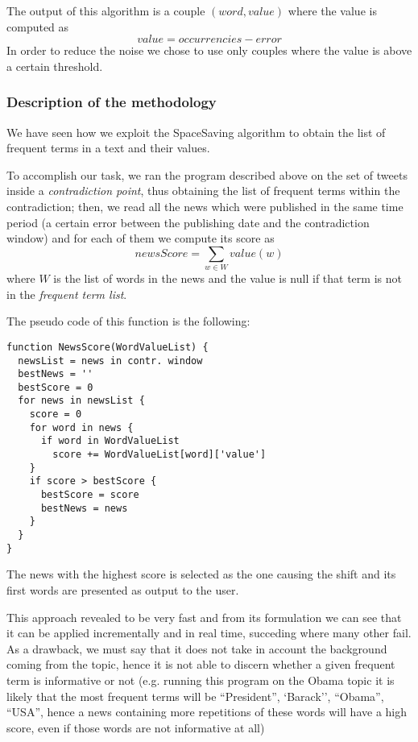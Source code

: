 The output of this algorithm is a couple $(word, value)$ where the value is
computed as 
\begin{displaymath}
	value = occurrencies - error
\end{displaymath}
In order to reduce the noise we chose to use only couples where the value is
above a certain threshold.

\subsubsection*{Description of the methodology}
We have seen how we exploit the SpaceSaving algorithm to obtain the list of
frequent terms in a text and their
values. 

To accomplish our task, we ran the program described above on the set of tweets inside a
\emph{contradiction point}, thus obtaining the list of frequent terms within the
contradiction; then, we read all the news which were published in the same time
period (a certain error between the publishing date and the contradiction
window) and for each of them we compute its score as
\begin{displaymath}
	newsScore = \sum_{w \in W} value(w)
\end{displaymath}
where $W$ is the list of words in the news and the value is null if that term is
not in the \emph{frequent term list}.

The pseudo code of this function is the following:
\begin{verbatim}
function NewsScore(WordValueList) {
  newsList = news in contr. window
  bestNews = ''
  bestScore = 0
  for news in newsList {
    score = 0
    for word in news {
      if word in WordValueList
        score += WordValueList[word]['value']
    }
    if score > bestScore {
      bestScore = score
      bestNews = news
    }
  }
}
\end{verbatim}

The news with the highest score is selected as the one causing the shift and its
first words are presented as output to the user.

This approach revealed to be very fast and from its formulation we can see that
it can be applied incrementally and in real time, succeding where many other fail. As a drawback, we must say that it does not
take in account the background coming from the topic, hence it is not able to
discern whether a given frequent term is informative or not (e.g. running this
program on the Obama topic it is likely that the most
frequent terms will be ``President'', `Barack'', ``Obama'', ``USA'', hence a
news containing more repetitions of these words will have a high score, even if
those words are not informative at all)
